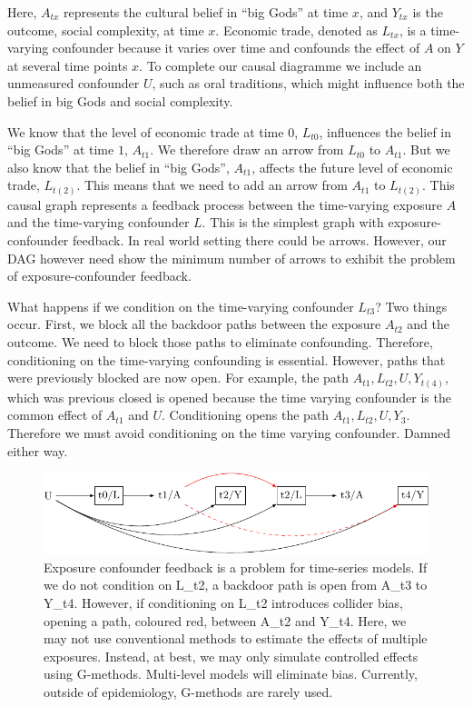 \documentclass[
  singlecolumn]{report}
\begin{document}
Here, \(A_{tx}\) represents the cultural belief in ``big Gods'' at time
\(x\), and \(Y_{tx}\) is the outcome, social complexity, at time \(x\).
Economic trade, denoted as \(L_{tx}\), is a time-varying confounder
because it varies over time and confounds the effect of \(A\) on \(Y\)
at several time points \(x\). To complete our causal diagramme we
include an unmeasured confounder \(U\), such as oral traditions, which
might influence both the belief in big Gods and social complexity.

We know that the level of economic trade at time \(0\), \(L_{t0}\),
influences the belief in ``big Gods'' at time \(1\), \(A_{t1}\). We
therefore draw an arrow from \(L_{t0}\) to \(A_{t1}\). But we also know
that the belief in ``big Gods'', \(A_{t1}\), affects the future level of
economic trade, \(L_{t(2)}\). This means that we need to add an arrow
from \(A_{t1}\) to \(L_{t(2)}\). This causal graph represents a feedback
process between the time-varying exposure \(A\) and the time-varying
confounder \(L\). This is the simplest graph with exposure-confounder
feedback. In real world setting there could be arrows. However, our DAG
however need show the minimum number of arrows to exhibit the problem of
exposure-confounder feedback.

What happens if we condition on the time-varying confounder \(L_{t3}\)?
Two things occur. First, we block all the backdoor paths between the
exposure \(A_{t2}\) and the outcome. We need to block those paths to
eliminate confounding. Therefore, conditioning on the time-varying
confounding is essential. However, paths that were previously blocked
are now open. For example, the path \(A_{t1}, L_{t2}, U, Y_{t(4)}\),
which was previous closed is opened because the time varying confounder
is the common effect of \(A_{t1}\) and \(U\). Conditioning opens the
path \(A_{t1}, L_{t2}, U, Y_{3}\). Therefore we must avoid conditioning
on the time varying confounder. Damned either way.

\begin{figure}

{\centering \includegraphics[width=1\textwidth,height=\textheight]{causal-dags_files/figure-pdf/fig-dag-9-1.pdf}

}

\caption{\label{fig-dag-9}Exposure confounder feedback is a problem for
time-series models. If we do not condition on L\_t2, a backdoor path is
open from A\_t3 to Y\_t4. However, if conditioning on L\_t2 introduces
collider bias, opening a path, coloured red, between A\_t2 and Y\_t4.
Here, we may not use conventional methods to estimate the effects of
multiple exposures. Instead, at best, we may only simulate controlled
effects using G-methods. Multi-level models will eliminate bias.
Currently, outside of epidemiology, G-methods are rarely used.}

\end{figure}
\end{document}
